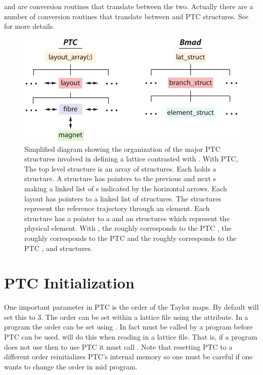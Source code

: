 {{ and  are conversion routines
that translate between the two. Actually there are a number of
conversion routines that translate between \bmad and PTC
structures. See  for more details.


\begin{figure}[tb]
  \centering
  \includegraphics{ptc-structures.pdf}
  \caption[PTC structure relationships] { 
Simplified diagram showing the organization of the major PTC
structures involved in defining a lattice contrasted with \bmad. With
PTC, The top level structure is an array of 
structures. Each  holds a  structure. A
 structure has pointers to the previous and next
s making a linked list of s indicated by the
horizontal arrows. Each layout has pointers to a linked list of
 structures. The  structures represent the
reference trajectory through an element. Each  structure has
a pointer to a  and an  structures which
represent the physical element. With \bmad, the 
roughly corresponds to the PTC , the
 roughly corresponds to the PTC  and the
 roughly corresponds to the PTC ,
 and  structures.
  }
\label{f:ptc-struct}
\end{figure}

\section{PTC Initialization}
\label{s:ptc.init}

One important parameter in PTC is the order of the Taylor maps.
By default \bmad will set this to 3. The order can be set within
a lattice file using the  attribute.
In a program the order can be set using . In fact
 must be called by a program before PTC can be used.
 will do this when reading in a lattice file.
That is, if a program does not use  then to use PTC it
must call . Note that resetting PTC to a different order
reinitializes PTC's internal memory so one must be careful if one wants
to change the order in mid program.

}}
